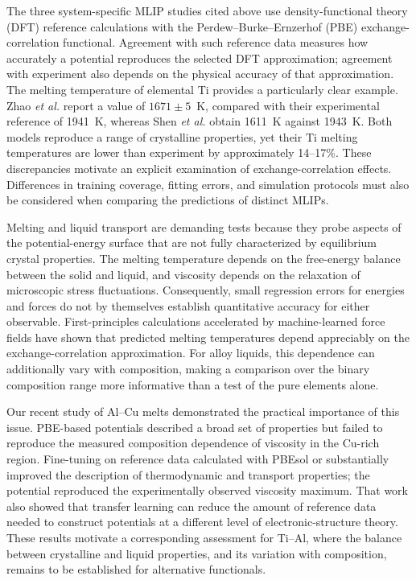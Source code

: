 The three system-specific MLIP studies cited above use density-functional theory (DFT) reference calculations with the Perdew--Burke--Ernzerhof (PBE) exchange-correlation functional.\cite{Seko2020,Zhao2024,Shen2025,Perdew1996}
Agreement with such reference data measures how accurately a potential reproduces the selected DFT approximation; agreement with experiment also depends on the physical accuracy of that approximation.
The melting temperature of elemental Ti provides a particularly clear example.
Zhao \textit{et al.} report a value of $1671\pm5$~K, compared with their experimental reference of 1941~K,\cite{Zhao2024} whereas Shen \textit{et al.} obtain 1611~K against 1943~K.\cite{Shen2025}
Both models reproduce a range of crystalline properties, yet their Ti melting temperatures are lower than experiment by approximately 14--17\%.
These discrepancies motivate an explicit examination of exchange-correlation effects.
Differences in training coverage, fitting errors, and simulation protocols must also be considered when comparing the predictions of distinct MLIPs.

Melting and liquid transport are demanding tests because they probe aspects of the potential-energy surface that are not fully characterized by equilibrium crystal properties.
The melting temperature depends on the free-energy balance between the solid and liquid, and viscosity depends on the relaxation of microscopic stress fluctuations.
Consequently, small regression errors for energies and forces do not by themselves establish quantitative accuracy for either observable.
First-principles calculations accelerated by machine-learned force fields have shown that predicted melting temperatures depend appreciably on the exchange-correlation approximation.\cite{Jinnouchi2019}
For alloy liquids, this dependence can additionally vary with composition, making a comparison over the binary composition range more informative than a test of the pure elements alone.

Our recent study of Al--Cu melts demonstrated the practical importance of this issue.\cite{Khazieva2024}
PBE-based potentials described a broad set of properties but failed to reproduce the measured composition dependence of viscosity in the Cu-rich region.
Fine-tuning on reference data calculated with PBEsol or \rscan{} substantially improved the description of thermodynamic and transport properties; the \rscan{} potential reproduced the experimentally observed viscosity maximum.
That work also showed that transfer learning can reduce the amount of reference data needed to construct potentials at a different level of electronic-structure theory.
These results motivate a corresponding assessment for Ti--Al, where the balance between crystalline and liquid properties, and its variation with composition, remains to be established for alternative functionals.

